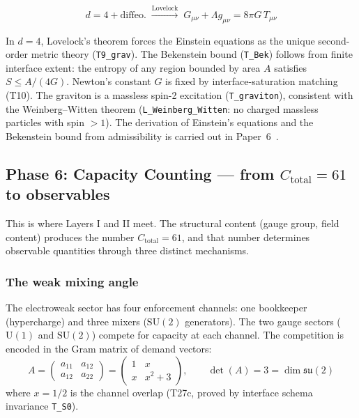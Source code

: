\documentclass[11pt]{article}
\newcommand{\SU}{\mathrm{SU}}
\newcommand{\U}{\mathrm{U}}
\begin{document}
\begin{equation}
d = 4 + \text{diffeo.} \;\xrightarrow{\text{Lovelock}}\; G_{\mu\nu} + \Lambda g_{\mu\nu} = 8\pi G\, T_{\mu\nu}
\end{equation}

In $d=4$, Lovelock's theorem forces the Einstein equations as the unique second-order metric theory (\texttt{T9\_grav}).  The Bekenstein bound (\texttt{T\_Bek}) follows from finite interface extent: the entropy of any region bounded by area $A$ satisfies $S \le A/(4G)$.  Newton's constant $G$ is fixed by interface-saturation matching (T10).  The graviton is a massless spin-2 excitation (\texttt{T\_graviton}), consistent with the Weinberg--Witten theorem (\texttt{L\_Weinberg\_Witten}: no charged massless particles with spin ${>}1$).  The derivation of Einstein's equations and the Bekenstein bound from admissibility is carried out in Paper~6~\cite{P6}.


\subsection{Phase 6: Capacity Counting --- from \texorpdfstring{$C_{\mathrm{total}}=61$}{Ctotal=61} to observables}

This is where Layers I and II meet.  The structural content (gauge group, field content) produces the number $C_{\mathrm{total}} = 61$, and that number determines observable quantities through three distinct mechanisms.

\subsubsection{The weak mixing angle}

The electroweak sector has four enforcement channels: one bookkeeper (hypercharge) and three mixers ($\SU(2)$ generators).  The two gauge sectors ($\U(1)$ and $\SU(2)$) compete for capacity at each channel.  The competition is encoded in the Gram matrix of demand vectors:
\begin{equation}
A = \begin{pmatrix} a_{11} & a_{12} \\ a_{12} & a_{22} \end{pmatrix} = \begin{pmatrix} 1 & x \\ x & x^2 + 3 \end{pmatrix}, \qquad \det(A) = 3 = \dim\mathfrak{su}(2)
\end{equation}
where $x = 1/2$ is the channel overlap (T27c, proved by interface schema invariance \texttt{T\_S0}).
\end{document}
